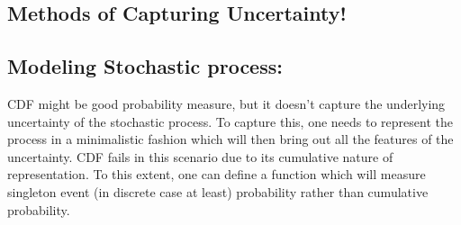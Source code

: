 \documentclass[12pt]{report} %
\begin{document}
	\newpage
	\begin{center}
		\section*{Methods of Capturing Uncertainty!}
	\end{center}
	
	\subsection*{Modeling Stochastic process:}
	CDF might be good probability measure, but it doesn't capture the underlying uncertainty of the stochastic process. To capture this, one needs to represent the process in a minimalistic fashion which will then bring out all the features of the uncertainty. CDF fails in this scenario due to its cumulative nature of representation. To this extent, one can define a function which will measure singleton event (in discrete case at least) probability rather than cumulative probability. 
	
\end{document}
